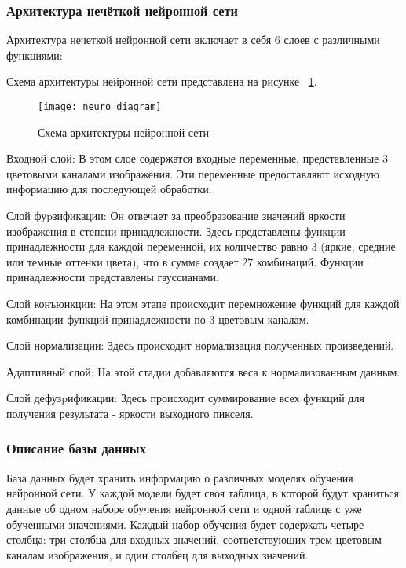 \subsubsection{Архитектура нечёткой нейронной сети}

Архитектура нечеткой нейронной сети включает в себя 6 слоев с различными функциями:

Схема архитектуры нейронной сети представлена на рисунке ~\ref{neuro_diagram:image}.

\begin{figure}[ht]
\texttt{[image: neuro\_diagram]}
\caption{Схема архитектуры нейронной сети}
\label{neuro_diagram:image}
\end{figure}

Входной слой: В этом слое содержатся входные переменные, представленные 3 цветовыми каналами изображения. Эти переменные предоставляют исходную информацию для последующей обработки.

Слой фуpзификации: Он отвечает за преобразование значений яркости изображения в степени принадлежности. Здесь представлены функции принадлежности для каждой переменной, их количество равно 3 (яркие, средние или темные оттенки цвета), что в сумме создает 27 комбинаций. Функции принадлежности представлены гауссианами.

Слой конъюнкции: На этом этапе происходит перемножение функций для каждой комбинации функций принадлежности по 3 цветовым каналам.

Слой нормализации: Здесь происходит нормализация полученных произведений.

Адаптивный слой: На этой стадии добавляются веса к нормализованным данным.

Слой дефузpификации: Здесь происходит суммирование всех функций для получения результата - яркости выходного пикселя.

\subsubsection{Описание базы данных}

База данных будет хранить информацию о различных моделях обучения нейронной сети. У каждой модели будет своя таблица, в которой будут храниться данные об одном наборе обучения нейронной сети и одной таблице с уже обученными значениями. Каждый набор обучения будет содержать четыре столбца: три столбца для входных значений, соответствующих трем цветовым каналам изображения, и один столбец для выходных значений.

